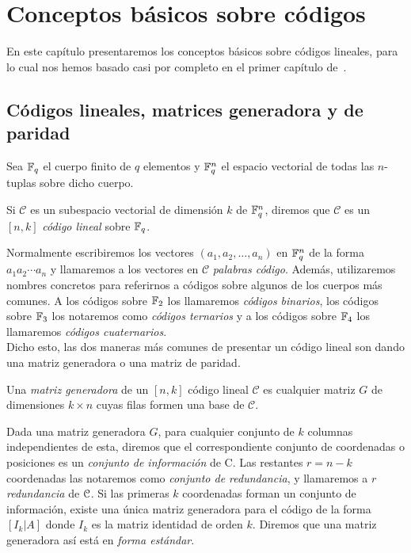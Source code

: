 \chapter{Conceptos básicos sobre códigos}%
\label{chap:conceptos_básicos_sobre_códigos}

En este capítulo presentaremos los conceptos básicos sobre códigos lineales, para lo cual nos hemos basado casi por completo en el primer capítulo de~\cite{huffman_fundamentals_2003}.

\section{Códigos lineales, matrices generadora y de paridad}%
\label{sec:códigos_lineales_matrices_generadora_y_de_paridad}

Sea \(\mathbb{F}_q\) el cuerpo finito de \(q\) elementos y \(\mathbb{F}_q^n\) el espacio vectorial de todas las \(n\)-tuplas sobre dicho cuerpo.

\begin{definition}
Si \(\mathcal{C}\) es un subespacio vectorial de dimensión \(k\) de \(\mathbb{F}_q^n\), diremos que \(\mathcal{C}\) es un \([n,k]\) \textit{código lineal} sobre \(\mathbb{F}_q\).
\end{definition}

Normalmente escribiremos los vectores \((a_1, a_2, \dots, a_n)\) en \(\mathbb{F}_q^n\) de la forma \(a_1 a_2 \cdots a_n\) y llamaremos a los vectores en \(\mathcal{C}\) \textit{palabras código}. Además, utilizaremos nombres concretos para referirnos a códigos sobre algunos de los cuerpos más comunes. A los códigos sobre \(\mathbb{F}_2\) los llamaremos \textit{códigos binarios}, los códigos sobre \(\mathbb{F}_3\) los notaremos como \textit{códigos ternarios} y a los códigos sobre \(\mathbb{F}_4\) los llamaremos \textit{códigos cuaternarios}.\\

Dicho esto, las dos maneras más comunes de presentar un código lineal son dando una matriz generadora o una matriz de paridad.

\begin{definition}
    Una \textit{matriz generadora} de un \([n,k]\) código lineal \(\mathcal{C}\) es cualquier matriz \(G\) de dimensiones \(k \times n\) cuyas filas formen una base de \(\mathcal{C}\).
\end{definition}

Dada una matriz generadora \(G\), para cualquier conjunto de \(k\) columnas independientes de esta, diremos que el correspondiente conjunto de coordenadas o posiciones es un \textit{conjunto de información} de C. Las restantes \(r=n-k\) coordenadas las notaremos como \textit{conjunto de redundancia}, y llamaremos a \(r\) \textit{redundancia} de \(\mathcal{C}\). Si las primeras \(k\) coordenadas forman un conjunto de información, existe una única matriz generadora para el código de la forma \([I_k | A]\) donde \(I_k\) es la matriz identidad de orden \(k\). Diremos que una matriz generadora así está en \textit{forma estándar}.

